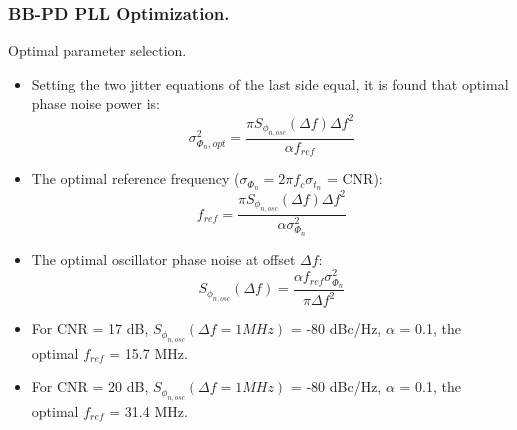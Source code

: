 \documentclass[t, screen, aspectratio=43]{beamer}
\begin{document}
\begin{frame}
	\frametitle{BB-PD PLL Optimization.}
	\begin{block}{Optimal parameter selection.}
	\tiny
	\begin{itemize}[itemsep=4pt,label=\protect---]
		\item Setting the two jitter equations of the last side equal, it is found that optimal phase noise power is:
		\tiny
		\begin{equation}
			\sigma^2_{\Phi_n, opt} = \frac{\pi S_{\phi_{n,osc}}(\Delta f) \Delta f^2}{\alpha f_{ref}}
		\end{equation}
		\item The optimal reference frequency ($\sigma_{\Phi_n}=2\pi f_c \sigma_{t_n}$ = CNR):
		\begin{equation}
			f_{ref} = \frac{\pi S_{\phi_{n,osc}}(\Delta f) \Delta f^2}{\alpha \sigma^2_{\Phi_n}}
		\end{equation}
		\item The optimal oscillator phase noise at offset $\Delta f$:
		\begin{equation}
			S_{\phi_{n,osc}}(\Delta f) = \frac{\alpha f_{ref}\sigma^2_{\Phi_n}}{\pi \Delta f^2} 
		\end{equation}
		\item For CNR = 17 dB, $S_{\phi_{n,osc}}(\Delta f = 1 MHz)$ = -80 dBc/Hz, $\alpha$ = 0.1, {\color{red}the optimal $f_{ref}$ = 15.7 MHz.}
		\item For CNR = 20 dB, $S_{\phi_{n,osc}}(\Delta f = 1 MHz)$ = -80 dBc/Hz, $\alpha$ = 0.1, {\color{red}the optimal $f_{ref}$ = 31.4 MHz.}
	\end{itemize}


	\end{block}	
\end{frame}
\end{document}
